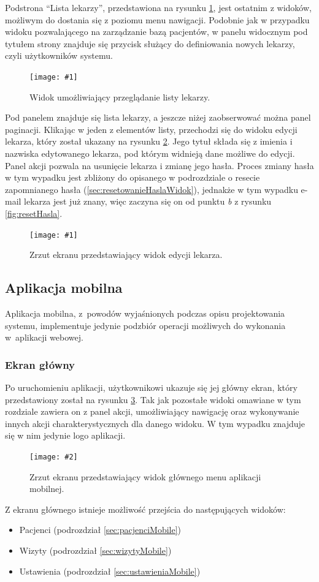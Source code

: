 \documentclass[11pt]{aghdpl}
\newcommand{\fullWidthPicture}[2]{
\begin{figure}[h!]
	\centering
		\texttt{[image: \#1]}
	\caption{#2}
	\label{fig:#1}
\end{figure}
}
\newcommand{\customWidthPicture}[3]{
\begin{figure}[h!]
	\centering
		\texttt{[image: \#2]}
	\caption{#3}
	\label{fig:#2}
\end{figure}
}
\begin{document}
Podstrona ``Lista lekarzy'', przedstawiona na rysunku \ref{fig:lekarze}, jest ostatnim z widoków, możliwym do dostania się z poziomu menu nawigacji. Podobnie jak w przypadku widoku pozwalającego na zarządzanie bazą pacjentów, w panelu widocznym pod tytułem strony znajduje się przycisk służący do definiowania nowych lekarzy, czyli użytkowników systemu.

\fullWidthPicture{lekarze}{Widok umożliwiający przeglądanie listy lekarzy.}

Pod panelem znajduje się lista lekarzy, a jeszcze niżej zaobserwować można panel paginacji. Klikając w jeden z elementów listy, przechodzi się do widoku edycji lekarza, który został ukazany na rysunku \ref{fig:lekarz}. Jego tytuł składa się z imienia i nazwiska edytowanego lekarza, pod którym widnieją dane możliwe do edycji. Panel akcji pozwala na usunięcie lekarza i zmianę jego hasła. Proces zmiany hasła w tym wypadku jest zbliżony do opisanego w podrozdziale o resecie zapomnianego hasła (\ref{sec:resetowanieHaslaWidok}), jednakże w tym wypadku e-mail lekarza jest już znany, więc zaczyna się on od punktu \emph{b} z rysunku \ref{fig:resetHasla}.

\fullWidthPicture{lekarz}{Zrzut ekranu przedstawiający widok edycji lekarza.}

\subsection{Aplikacja mobilna}

Aplikacja mobilna, z~powodów wyjaśnionych podczas opisu projektowania systemu, implementuje jedynie podzbiór operacji możliwych do wykonania w~aplikacji webowej.

\subsubsection{Ekran główny}
\label{sec:ekranGlownyMobile}

Po uruchomieniu aplikacji, użytkownikowi ukazuje się jej główny ekran, który przedstawiony został na rysunku \ref{fig:ekranGlownyMobile}. Tak jak pozostałe widoki omawiane w tym rozdziale zawiera on z panel akcji, umożliwiający nawigację oraz wykonywanie innych akcji charakterystycznych dla danego widoku. W tym wypadku znajduje się w nim jedynie logo aplikacji.

\customWidthPicture{.3}{ekranGlownyMobile}{Zrzut ekranu przedstawiający widok głównego menu aplikacji mobilnej.}

Z ekranu głównego istnieje możliwość przejścia do następujących widoków:
\begin{itemize}
\item Pacjenci (podrozdział \ref{sec:pacjenciMobile})
\item Wizyty (podrozdział \ref{sec:wizytyMobile})
\item Ustawienia (podrozdział \ref{sec:ustawieniaMobile})
\end{itemize}
\end{document}
